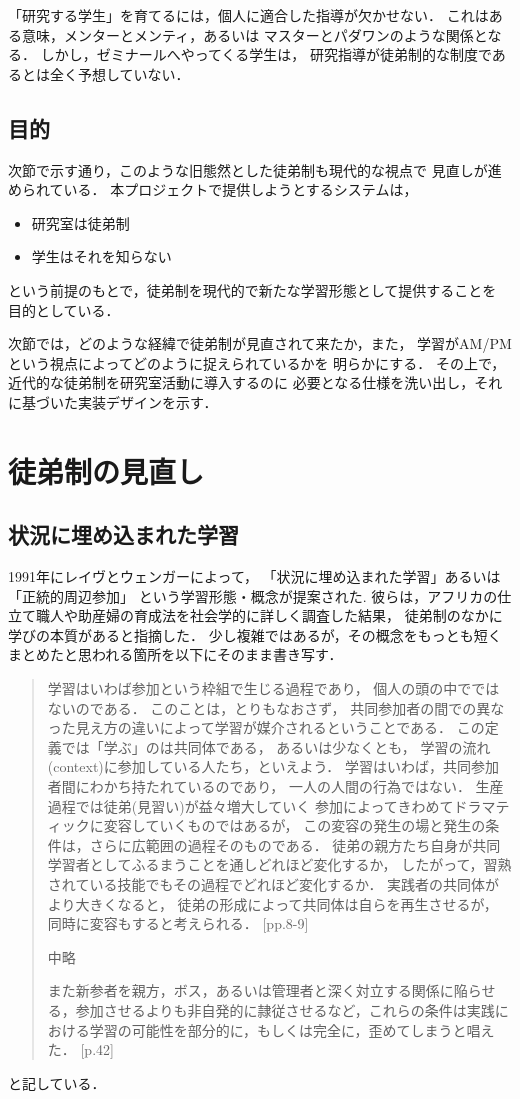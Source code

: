 \documentclass{hissymp}
\begin{document}
「研究する学生」を育てるには，個人に適合した指導が欠かせない．
これはある意味，メンターとメンティ，あるいは
マスターとパダワンのような関係となる．
しかし，ゼミナールへやってくる学生は，
研究指導が徒弟制的な制度であるとは全く予想していない．

\subsection{目的}
\label{sec:orgcaccec1}
次節で示す通り，このような旧態然とした徒弟制も現代的な視点で
見直しが進められている．
本プロジェクトで提供しようとするシステムは，
\begin{itemize}
\item 研究室は徒弟制
\item 学生はそれを知らない
\end{itemize}
という前提のもとで，徒弟制を現代的で新たな学習形態として提供することを
目的としている．

次節では，どのような経緯で徒弟制が見直されて来たか，また，
学習がAM/PMという視点によってどのように捉えられているかを
明らかにする．
その上で，近代的な徒弟制を研究室活動に導入するのに
必要となる仕様を洗い出し，それに基づいた実装デザインを示す．

\section{徒弟制の見直し}
\label{sec:orgeafec21}
\subsection{状況に埋め込まれた学習}
\label{sec:orgaaa328b}
1991年にレイヴとウェンガーによって，
  「状況に埋め込まれた学習」あるいは「正統的周辺参加」
  という学習形態・概念が提案された\cite{LaveWenger}.
  彼らは，アフリカの仕立て職人や助産婦の育成法を社会学的に詳しく調査した結果，
  徒弟制のなかに学びの本質があると指摘した．
少し複雑ではあるが，その概念をもっとも短くまとめたと思われる箇所を以下にそのまま書き写す．
\begin{quote}
学習はいわば参加という枠組で生じる過程であり，
個人の頭の中でではないのである．
このことは，とりもなおさず，
共同参加者の間での異なった見え方の違いによって学習が媒介されるということである．
この定義では「学ぶ」のは共同体である，
あるいは少なくとも，
学習の流れ(context)に参加している人たち，といえよう．
学習はいわば，共同参加者間にわかち持たれているのであり，
一人の人間の行為ではない．
生産過程では徒弟(見習い)が益々増大していく
参加によってきわめてドラマティックに変容していくものではあるが，
この変容の発生の場と発生の条件は，さらに広範囲の過程そのものである．
徒弟の親方たち自身が共同学習者としてふるまうことを通しどれほど変化するか，
したがって，習熟されている技能でもその過程でどれほど変化するか．
実践者の共同体がより大きくなると，
徒弟の形成によって共同体は自らを再生させるが，
同時に変容もすると考えられる．
\cite{LaveWenger}[pp.8-9]

中略

また新参者を親方，ボス，あるいは管理者と深く対立する関係に陥らせる，参加させるよりも非自発的に隷従させるなど，これらの条件は実践における学習の可能性を部分的に，もしくは完全に，歪めてしまうと唱えた．
\cite{LaveWenger}[p.42]
\end{quote}
と記している．
\end{document}
